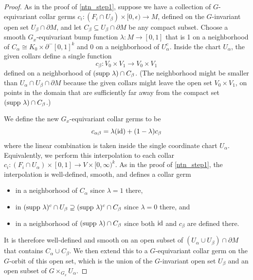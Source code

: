 \documentclass[11pt]{amsart}
\theoremstyle{definition}
\numberwithin{equation}{section}
\numberwithin{figure}{section}
\newcommand{\id}{\textup{id}}
\begin{document}
\begin{proof}
	As in the proof of \autoref{ntn_step1}, suppose we have a collection of $G$-equivariant collar germs $c_i\colon (F_i \cap U_\beta) \times [0,\epsilon) \to M$, defined on the $G$-invariant open set $U_\beta \cap \partial M$, and let $C_\beta \subseteq U_\beta \cap \partial M$ be any compact subset. Choose a smooth $G_x$-equivariant bump function $\lambda\colon M \to [0,1]$ that is 1 on a neighborhood of $C_\alpha \cong K_0 \times \partial^- [0,1]^k$ and 0 on a neighborhood of $U_\alpha^c$. Inside the chart $U_\alpha$, the given collars define a single function
	\[ c_\beta\colon V_0 \times V_1 \to V_0 \times V_1 \]
	defined on a neighborhood of $(\textup{supp }\lambda) \cap C_\beta$. (The neighborhood might be smaller than $U_\alpha \cap U_\beta \cap \partial M$ because the given collars might leave the open set $V_0 \times V_1$, on points in the domain that are sufficiently far away from the compact set $(\textup{supp }\lambda) \cap C_\beta$.)
	
	We define the new $G_x$-equivariant collar germs to be
	\[ c_{\alpha\beta} = \lambda(\id) + (1-\lambda)c_\beta \]
	where the linear combination is taken inside the single coordinate chart $U_\alpha$. Equivalently, we perform this interpolation to each collar $c_i\colon (F_i \cap U_\alpha) \times [0,1] \to V \times [0,\infty)^k$. As in the proof of \autoref{ntn_step1}, the interpolation is well-defined, smooth, and defines a collar germ
	\begin{itemize}
		\item in a neighborhood of $C_\alpha$ since $\lambda = 1$ there,
		\item in $(\textup{supp }\lambda)^c \cap U_\beta \supseteq (\textup{supp }\lambda)^c \cap C_\beta$ since $\lambda = 0$ there, and
		\item in a neighborhood of $(\textup{supp }\lambda) \cap C_\beta$ since both $\id$ and $c_\beta$ are defined there.
	\end{itemize}
	It is therefore well-defined and smooth on an open subset of $(U_\alpha \cup U_\beta) \cap \partial M$ that contains $C_\alpha \cup C_\beta$. We then extend this to a $G$-equivariant collar germ on the $G$-orbit of this open set, which is the union of the $G$-invariant open set $U_\beta$ and an open subset of $G \times_{G_x} U_\alpha$.
	

\end{proof}
\end{document}
